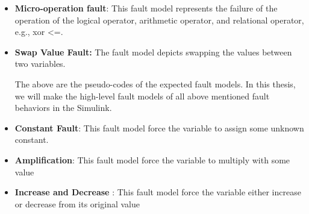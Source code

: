 \begin{itemize}
\item \textbf{Micro-operation fault}: This fault model represents the failure of the operation of the logical operator, arithmetic operator, and relational operator, e.g., xor <=.   
\item \textbf{Swap Value Fault:} The fault model depicts swapping the values between two variables.

The above are the pseudo-codes of the expected fault models. In this thesis, we will make the high-level fault models of all above mentioned fault behaviors in the Simulink. 
\item \textbf{Constant Fault}: This fault model force the variable to assign some unknown constant.

\item \textbf{Amplification}: This fault model force the variable to multiply with some value

\item \textbf{Increase and Decrease }: This fault model force the variable either increase or decrease from its original value
\end{itemize}

